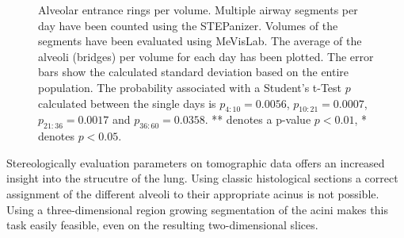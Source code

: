 \begin{figure}
	\centering
	\caption[Alveolar entrance rings per volume]{Alveolar entrance rings per volume. Multiple airway segments per day have been counted using the STEPanizer. Volumes of the segments have been evaluated using MeVisLab. The average of the alveoli (bridges) per volume for each day has been plotted. The error bars show the calculated standard deviation based on the entire population. The probability associated with a Student's t-Test $p$ calculated between the single days is $p_{4:10}=0.0056$, $p_{10:21}=0.0007$, $p_{21:36}=0.0017$ and $p_{36:60}=0.0358$. ** denotes a p-value $p<0.01$, * denotes $p<0.05$.}
	\label{fig:alveoli per volume plot}
\end{figure}

Stereologically evaluation parameters on tomographic data offers an increased insight into the strucutre of the lung. Using classic histological sections a correct assignment of the different alveoli to their appropriate acinus is not possible. Using a three-dimensional region growing segmentation of the acini makes this task easily feasible, even on the resulting two-dimensional slices.
